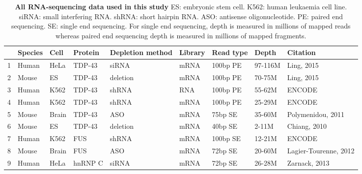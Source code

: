 
\begin{table}[h!]
	\caption[All RNA-sequencing data used in this study]{
		\textbf{All RNA-sequencing data used in this study}
	ES: embryonic stem cell. K562: human leukaemia cell line. siRNA: small interfering RNA. shRNA: short hairpin RNA. ASO: antisense oligonucleotide. PE: paired end sequencing. SE: single end sequencing. 
	For single end sequencing, depth is measured in millions of mapped reads whereas paired end sequencing depth is measured in millions of mapped fragments.
}
	\label{table:cryptic_sequence_stats}
	\centering
	\begin{small}
		\begin{tabular}{llllp{1.5cm}llll}
			& Species & Cell & Protein & Depletion method & Library & Read type & Depth & Citation\\
			\hline
			1 & Human & HeLa & TDP-43 & siRNA & mRNA & 100bp PE & 97-116M & Ling, 2015\\
			2 & Mouse & ES & TDP-43 & deletion & mRNA & 100bp PE & 70-75M & Ling, 2015\\
			3 & Human & K562 & TDP-43 & shRNA & RNA & 100bp PE & 55-62M & ENCODE\\
			4 & Human & K562 & TDP-43 & shRNA & mRNA & 100bp PE & 25-29M & ENCODE\\
			5 & Mouse & Brain & TDP-43 & ASO & mRNA & 75bp SE & 35-60M & Polymenidou, 2011\\
			6 & Mouse & ES & TDP-43 & deletion & mRNA & 40bp SE & 2-11M & Chiang, 2010\\
			7 & Human & K562 & FUS & shRNA & mRNA & 100bp SE & 12-21M & ENCODE\\
			8 & Mouse & Brain & FUS & ASO & mRNA & 72bp SE & 20-60M & Lagier-Tourenne, 2012\\
			9 & Human & HeLa & hnRNP C & siRNA & mRNA & 72bp SE & 26-28M & Zarnack, 2013\\
		\end{tabular}
	\end{small}
\end{table}


